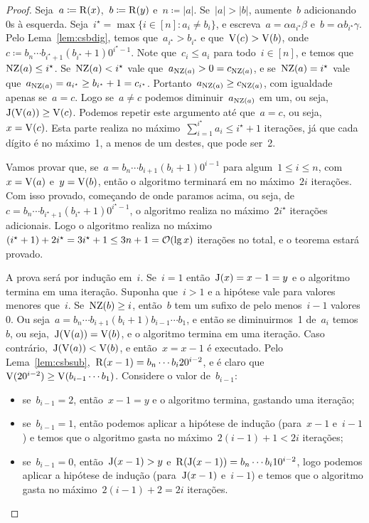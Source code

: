 \documentclass[main.tex]{subfiles}
\begin{document}
\begin{proof}
	Seja~$a \coloneqq \operatorname{R}(x)$,~$b \coloneqq \operatorname{R}(y)$ e~$n \coloneqq |a|$. Se~$|a| > |b|$, aumente~$b$ adicionando 0s à esquerda. Seja~${i^\star = \max\{i \in [n] : a_i \neq b_i\}}$, e escreva~${a = \alpha a_{i^\star} \beta}$ e~${b = \alpha b_{i^\star} \gamma}$. Pelo Lema~\ref{lem:csbdig}, temos que~$a_{i^\star} > b_{i^\star}$ e que~${\operatorname{V}(c) > \operatorname{V}(b)}$, onde~${c \coloneqq b_n \cdots b_{i^\star + 1} (b_{i^\star} + 1) 0^{i^\star - 1}}$. Note que~$c_i \leq a_i$ para todo~${i \in [n]}$, e temos que~$\operatorname{NZ}(a) \leq i^\star$. Se~$\operatorname{NZ}(a) < i^\star$ vale que~$a_{\operatorname{NZ}(a)} > 0 = c_{\operatorname{NZ}(a)}$, e se~$\operatorname{NZ}(a) = i^\star$ vale que~${a_{\operatorname{NZ}(a)} = a_{i^\star} \geq b_{i^\star} + 1 = c_{i^\star}}$. Portanto~$a_{\operatorname{NZ}(a)} \geq c_{\operatorname{NZ}(a)}$, com igualdade apenas se~$a = c$. Logo se~$a \neq c$ podemos diminuir~$a_{\operatorname{NZ}(a)}$ em um, ou seja,~$\operatorname{J}(\operatorname{V}(a)) \geq \operatorname{V}(c)$. Podemos repetir este argumento até que~$a = c$, ou seja,~$x = \operatorname{V}(c)$. Esta parte realiza no máximo~${\sum\limits_{i = 1}^{i^\star}{a_i} \leq i^\star + 1}$ iterações, já que cada dígito é no máximo~1, a menos de um destes, que pode ser~2.

	Vamos provar que, se~${a = b_n \cdots b_{i+1} (b_i + 1) 0^{i-1}}$ para algum~$1 \leq i \leq n$, com~$x = \operatorname{V}(a)$ e~$y = \operatorname{V}(b)$, então o algoritmo terminará em no máximo~$2i$ iterações. Com isso provado, começando de onde paramos acima, ou seja, de~${c = b_n \cdots b_{i^\star + 1} (b_{i^\star} + 1) 0^{i^\star - 1}}$, o algoritmo realiza no máximo~$2i^\star$ iterações adicionais. Logo o algoritmo realiza no máximo~${(i^\star + 1) + 2i^\star = 3i^\star + 1 \leq 3n+1 = \mathcal{O}(\lg x)}$ iterações no total, e o teorema estará provado.

	A prova será por indução em~$i$. Se~$i = 1$ então~${\operatorname{J}(x) = x - 1 = y}$ e o algoritmo termina em uma iteração.
	Suponha que~$i > 1$ e a hipótese vale para valores menores que~$i$. Se~${\operatorname{NZ}(b) \geq i}$, então~$b$ tem um sufixo de pelo menos~$i - 1$ valores 0. Ou seja~${a = b_n \cdots b_{i + 1} (b_{i} + 1) b_{i - 1} \cdots b_1}$, e então se diminuirmos~1 de~$a_{i}$ temos~$b$, ou seja,~${\operatorname{J}(\operatorname{V}(a)) = \operatorname{V}(b)}$, e o algoritmo termina em uma iteração.
	Caso contrário,~$\operatorname{J}(\operatorname{V}(a)) < \operatorname{V}(b)$, e então~$x = x - 1$ é executado. Pelo Lema~\ref{lem:csbsub},~${\operatorname{R}(x - 1) = b_n \cdots b_i 2 0^{i-2}}$, e é claro que~${\operatorname{V}(20^{i-2}) \geq \operatorname{V}(b_{i-1} \cdots b_1)}$. Considere o valor de~$b_{i-1}$:
	\begin{itemize}
		\item se~$b_{i-1} = 2$, então~$x - 1 = y$ e o algoritmo termina, gastando uma iteração;
		\item se~$b_{i-1} = 1$, então podemos aplicar a hipótese de indução (para~$x - 1$ e~$i - 1$) e temos que o algoritmo gasta no máximo~$2(i - 1) + 1 < 2i$ iterações;
		\item se~$b_{i-1} = 0$, então~$\operatorname{J}(x - 1) > y$ e~$\operatorname{R}(\operatorname{J}(x - 1)) = b_n \cdots b_i 1 0^{i-2}$, logo podemos aplicar a hipótese de indução (para~$\operatorname{J}(x-1)$ e~$i-1$) e temos que o algoritmo gasta no máximo~$2(i-1) + 2 = 2i$ iterações.
	\end{itemize}
\end{proof}
\end{document}
